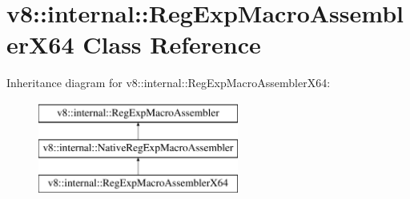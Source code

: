 \hypertarget{classv8_1_1internal_1_1RegExpMacroAssemblerX64}{}\section{v8\+:\+:internal\+:\+:Reg\+Exp\+Macro\+Assembler\+X64 Class Reference}
\label{classv8_1_1internal_1_1RegExpMacroAssemblerX64}
Inheritance diagram for v8\+:\+:internal\+:\+:Reg\+Exp\+Macro\+Assembler\+X64\+:\begin{figure}[H]
\begin{center}
\leavevmode
\includegraphics[height=3.000000cm]{classv8_1_1internal_1_1RegExpMacroAssemblerX64}
\end{center}
\end{figure}
